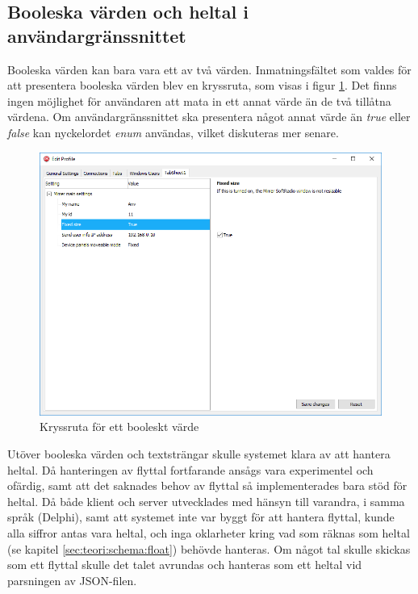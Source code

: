 \subsection{Booleska värden och heltal i användargränssnittet}

Booleska värden kan bara vara ett av två värden. Inmatningsfältet som valdes för att presentera booleska värden blev en kryssruta, som visas i figur \ref{fig:bool}. Det finns ingen möjlighet för användaren att mata in ett annat värde än de två tillåtna värdena. Om användargränssnittet ska presentera något annat värde än \textit{true} eller \textit{false} kan nyckelordet \textit{enum} användas, vilket diskuteras mer senare.

\begin{figure}
	\includegraphics[width=\textwidth]{./images/gui/bool.png}
	\vspace{-1.7em}
	\caption{Kryssruta för ett booleskt värde}
	\label{fig:bool}
\end{figure}

Utöver booleska värden och textsträngar skulle systemet klara av att hantera heltal. Då hanteringen av flyttal fortfarande ansågs vara experimentel och ofärdig, samt att det saknades behov av flyttal så implementerades bara stöd för heltal. Då både klient och server utvecklades med hänsyn till varandra, i samma språk (Delphi), samt att systemet inte var byggt för att hantera flyttal, kunde alla siffror antas vara heltal, och inga oklarheter kring vad som räknas som heltal (se kapitel \ref{sec:teori:schema:float}) behövde hanteras. Om något tal skulle skickas som ett flyttal skulle det talet avrundas och hanteras som ett heltal vid parsningen av JSON-filen.

